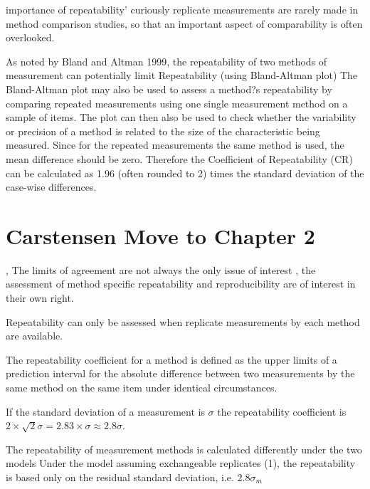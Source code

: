 \documentclass[12pt, a4paper]{report}
\theoremstyle{plain}
\theoremstyle{definition}
\theoremstyle{remark}
\begin{document}
	importance of repeatability' curiously replicate measurements are rarely made in method comparison studies, so that an important aspect of comparability is often overlooked.
	

	As noted by Bland and Altman 1999, the repeatability of two methods of measurement can  potentially limit
	Repeatability (using Bland-Altman plot)
	The Bland-Altman plot may also be used to assess a method?s repeatability by comparing repeated measurements using one single measurement method on a sample of items.
	The plot can then also be used to check whether the variability or precision of a method is related to the size of the characteristic being measured.
	Since for the repeated measurements the same method is used, the mean difference should be zero.
	Therefore the Coefficient of Repeatability (CR) can be calculated as 1.96 (often rounded to 2) times the standard deviation of the case-wise differences.
	



		
		
	\section{Carstensen Move to Chapter 2}
, The limits of agreement are not always the only issue of
		interest , the assessment of method specific repeatability and
		reproducibility are of interest in their own right.
		
 Repeatability can only be assessed when replicate
		measurements by each method are available.
		
 The repeatability coefficient for a method is defined as the
		upper limits of a prediction interval for the absolute difference
		between two measurements by the same method on the same item under
		identical circumstances.
		
 If the standard deviation of a measurement is $\sigma$ the
		repeatability coefficient is $2\times\sqrt{2} \sigma = 2.83\times
		\sigma \approx 2.8 \sigma$.
		
		
The repeatability of measurement methods is calculated
		differently under the two models  Under the model assuming
		exchangeable replicates (1), the repeatability is based only on
		the residual standard deviation, i.e. $2.8\sigma_m$
		
\end{document}
